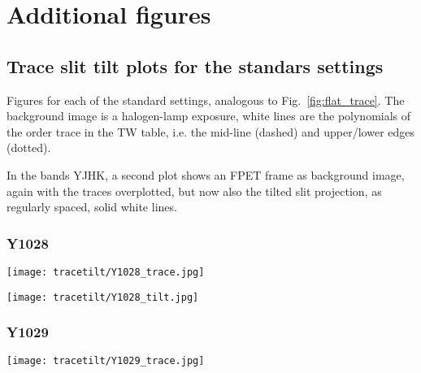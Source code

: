 \section{Additional figures}
\label{sec:extrafigs}

\subsection{Trace slit tilt plots for the standars settings}
Figures for each of the standard settings, analogous to
Fig.~\ref{fig:flat_trace}. The background image is a halogen-lamp exposure,
white lines are the polynomials of the order trace in the TW table, i.e. the
mid-line (dashed) and upper/lower edges (dotted).

In the bands YJHK, a second plot shows an FPET frame as background image, again
with the traces overplotted, but now also the tilted slit projection, as
regularly spaced, solid white lines.




\subsubsection{Y1028}
\texttt{[image: tracetilt/Y1028\_trace.jpg]}

\texttt{[image: tracetilt/Y1028\_tilt.jpg]}

\subsubsection{Y1029}
\texttt{[image: tracetilt/Y1029\_trace.jpg]}

